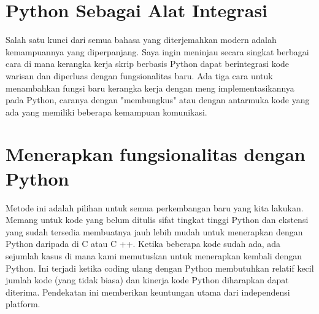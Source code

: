 \documentclass[12pt, times new roman, a4paper]{article}
\begin{document}
\section{Python Sebagai Alat Integrasi}
Salah satu kunci dari semua bahasa yang diterjemahkan modern adalah kemampuannya yang diperpanjang. Saya ingin meninjau secara singkat berbagai cara di mana kerangka kerja skrip berbasis Python dapat berintegrasi kode warisan dan diperluas dengan fungsionalitas baru. Ada tiga cara untuk menambahkan fungsi baru kerangka kerja dengan meng implementasikannya pada Python, caranya dengan "membungkus" atau dengan antarmuka kode yang ada yang memiliki beberapa kemampuan komunikasi.

\section{Menerapkan fungsionalitas dengan Python}
Metode ini adalah pilihan untuk semua perkembangan baru yang kita lakukan. Memang untuk kode yang belum ditulis sifat tingkat tinggi Python dan ekstensi yang sudah tersedia membuatnya jauh lebih mudah untuk menerapkan dengan Python daripada di C atau C ++. Ketika beberapa kode sudah ada, ada sejumlah kasus di mana kami memutuskan untuk menerapkan kembali dengan Python. Ini terjadi ketika coding ulang dengan Python membutuhkan relatif kecil jumlah kode (yang tidak biasa) dan kinerja kode Python diharapkan dapat diterima. Pendekatan ini memberikan keuntungan utama dari independensi platform.
\end{document}
